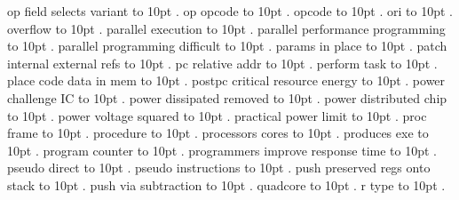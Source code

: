 \smallskip
op field selects variant \leaders\hbox to 10pt {\hss.\hss}  \hfill {}
\smallskip
op opcode \leaders\hbox to 10pt {\hss.\hss}  \hfill {}
\smallskip
opcode \leaders\hbox to 10pt {\hss.\hss}  \hfill {}
\smallskip
ori \leaders\hbox to 10pt {\hss.\hss}  \hfill {}
\smallskip
overflow \leaders\hbox to 10pt {\hss.\hss}  \hfill {}
\smallskip
parallel execution \leaders\hbox to 10pt {\hss.\hss}  \hfill {}
\smallskip
parallel performance programming \leaders\hbox to 10pt {\hss.\hss}  \hfill {}
\smallskip
parallel programming difficult \leaders\hbox to 10pt {\hss.\hss}  \hfill {}
\smallskip
params in place \leaders\hbox to 10pt {\hss.\hss}  \hfill {}
\smallskip
patch internal external refs \leaders\hbox to 10pt {\hss.\hss}  \hfill {}
\smallskip
pc relative addr \leaders\hbox to 10pt {\hss.\hss}  \hfill {}
\smallskip
perform task \leaders\hbox to 10pt {\hss.\hss}  \hfill {}
\smallskip
place code data in mem \leaders\hbox to 10pt {\hss.\hss}  \hfill {}
\smallskip
postpc critical resource energy \leaders\hbox to 10pt {\hss.\hss}  \hfill {}
\smallskip
power challenge IC \leaders\hbox to 10pt {\hss.\hss}  \hfill {}
\smallskip
power dissipated removed \leaders\hbox to 10pt {\hss.\hss}  \hfill {}
\smallskip
power distributed chip \leaders\hbox to 10pt {\hss.\hss}  \hfill {}
\smallskip
power voltage squared \leaders\hbox to 10pt {\hss.\hss}  \hfill {}
\smallskip
practical power limit \leaders\hbox to 10pt {\hss.\hss}  \hfill {}
\smallskip
proc frame \leaders\hbox to 10pt {\hss.\hss}  \hfill {}
\smallskip
procedure \leaders\hbox to 10pt {\hss.\hss}  \hfill {}
\smallskip
processors cores \leaders\hbox to 10pt {\hss.\hss}  \hfill {}
\smallskip
produces exe \leaders\hbox to 10pt {\hss.\hss}  \hfill {}
\smallskip
program counter \leaders\hbox to 10pt {\hss.\hss}  \hfill {}
\smallskip
programmers improve response time \leaders\hbox to 10pt {\hss.\hss}  \hfill {}
\smallskip
pseudo direct \leaders\hbox to 10pt {\hss.\hss}  \hfill {}
\smallskip
pseudo instructions \leaders\hbox to 10pt {\hss.\hss}  \hfill {}
\smallskip
push preserved regs onto stack \leaders\hbox to 10pt {\hss.\hss}  \hfill {}
\smallskip
push via subtraction \leaders\hbox to 10pt {\hss.\hss}  \hfill {}
\smallskip
quadcore \leaders\hbox to 10pt {\hss.\hss}  \hfill {}
\smallskip
r type \leaders\hbox to 10pt {\hss.\hss}  \hfill {}
\smallskip
